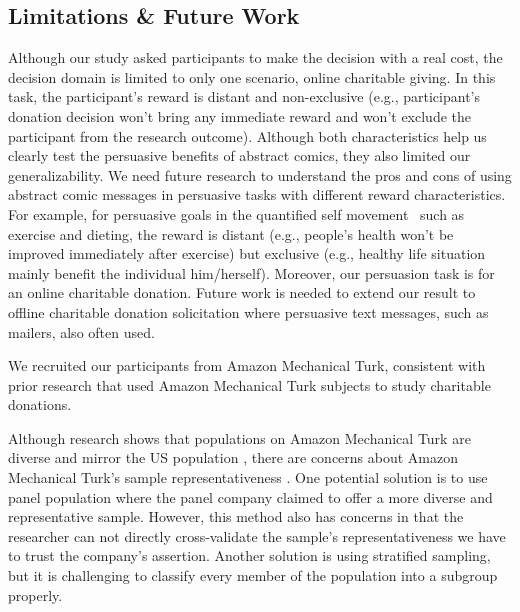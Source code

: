 \subsection{Limitations \& Future Work}
\begin{description}[leftmargin=\parindent,topsep=0pt,partopsep=3pt,parsep=0pt,itemsep=3pt, listparindent=\parindent]
\item[Distant and Non-exclusive Task:]  Although our study asked participants to make the decision with a real cost, the decision domain is limited to only one scenario, online charitable giving. In this task, the participant's reward is distant and non-exclusive (e.g., participant's donation decision won't bring any immediate reward and won't exclude the participant from the research outcome). Although both characteristics help us clearly test the persuasive benefits of abstract comics, they also limited our generalizability. We need future research to understand the pros and cons of using abstract comic messages in persuasive tasks with different reward characteristics. For example, for persuasive goals in the quantified self movement~\cite{Epstein2014,Choe2014} such as exercise and dieting, the reward is distant (e.g., people's health won't be improved immediately after exercise) but exclusive (e.g., healthy life situation mainly benefit the individual him/herself). Moreover, our persuasion task is for an online charitable donation. Future work is needed to extend our result to offline charitable donation solicitation where persuasive text messages, such as mailers, also often used. 
\item[Study on Amazon Mechanical Turk:] We recruited our participants from Amazon Mechanical Turk, consistent with prior research \cite{lee2013does,saunders2016no,sussman2015framing,arechar2017turking,branas2018gender} that used Amazon Mechanical Turk subjects to study charitable donations. 


Although research shows that populations on Amazon Mechanical Turk are diverse and mirror the US population \cite{buhrmester2011amazon,behrend2011viability,berinsky2012evaluating}, there are concerns about Amazon Mechanical Turk's sample representativeness \cite{landers2015inconvenient,paolacci2010running}. One potential solution is to use panel population where the panel company claimed to offer a more diverse and representative sample.
However, this method also has concerns in that the researcher can not directly cross-validate the sample's representativeness we have to trust the company's assertion. Another solution is using stratified sampling, but it is challenging to classify every member of the population into a subgroup properly. 


\end{description}
